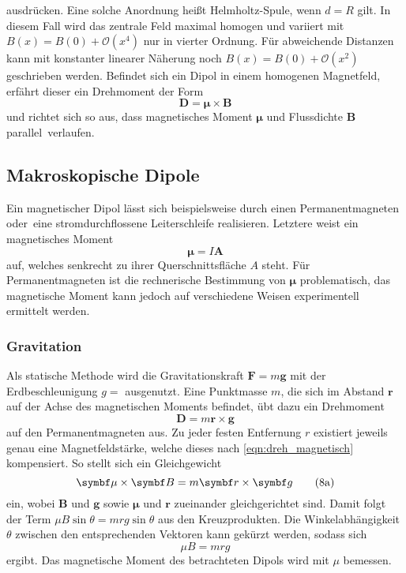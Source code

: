 ausdrücken. Eine solche Anordnung heißt Helmholtz-Spule, wenn $d = R$ gilt. In diesem Fall wird das zentrale Feld
maximal homogen und variiert mit $B(x) = B(0) + \mathcal{O}(x^4)$ nur in vierter Ordnung. Für abweichende Distanzen kann
mit konstanter linearer Näherung noch $B(x) = B(0) + \mathcal{O}(x^2)$ geschrieben werden. Befindet sich ein Dipol in einem
homogenen Magnetfeld, erfährt dieser ein Drehmoment der Form
\begin{equation}
	\symbf D = \symbf \mu \times \symbf B
	\label{eqn:dreh_magnetisch}
\end{equation}
und richtet sich so aus, dass magnetisches Moment $\symbf \mu$ und Flussdichte $\symbf B$ \mbox{parallel verlaufen.}
\enlargethispage{\baselineskip}\newpage

\subsection{Makroskopische Dipole}

Ein magnetischer Dipol lässt sich beispielsweise durch einen Permanentmagneten oder~eine stromdurchflossene
Leiterschleife realisieren. Letztere weist ein magnetisches Moment
\begin{equation}
	\symbf \mu = I \symbf A
	\label{eqn:moment_schleife}
\end{equation}
auf, welches senkrecht zu ihrer Querschnittsfläche $A$ steht. Für Permanentmagneten ist die rechnerische Bestimmung
von $\symbf \mu$ problematisch, das magnetische Moment kann jedoch auf verschiedene Weisen experimentell ermittelt
werden.

\subsubsection{Gravitation}

Als statische Methode wird die Gravitationskraft $\symbf F = m \symbf g$ mit der Erdbeschleunigung
$g = $ \cite{scipy} ausgenutzt. Eine Punktmasse $m$, die sich im Abstand $\symbf r$
auf der Achse des magnetischen Moments befindet, übt dazu ein Drehmoment
\begin{equation}
	\symbf D = m \symbf r \times \symbf g
	\label{eqn:dreh_gravitation}
\end{equation}
auf den Permanentmagneten aus. Zu jeder festen Entfernung $r$ existiert jeweils genau eine Magnetfeldstärke, welche dieses
nach \eqref{eqn:dreh_magnetisch} kompensiert. So stellt sich ein Gleichgewicht
\begin{equation}
	\symbf \mu \times \symbf B = m \symbf r \times \symbf g
	\stepcounter{equation}
	\tag{8a}
	\label{eqn:dreh_gleichgewicht_vektor}
\end{equation}
ein, wobei $\symbf B$ und $\symbf g$ sowie $\symbf \mu$ und $\symbf r$ zueinander gleichgerichtet sind. Damit folgt
der Term $\mu B \sin \theta = m r g \sin \theta$ aus den Kreuzprodukten. Die Winkelabhängigkeit $\theta$ zwischen
den entsprechenden Vektoren kann gekürzt werden, sodass sich
\begin{equation}
	\mu B = m r g
	\tag{8b}
	\label{eqn:dreh_gleichgewicht_skalar}
\end{equation}
ergibt. Das magnetische Moment des betrachteten Dipols wird mit $\mu$ bemessen.

